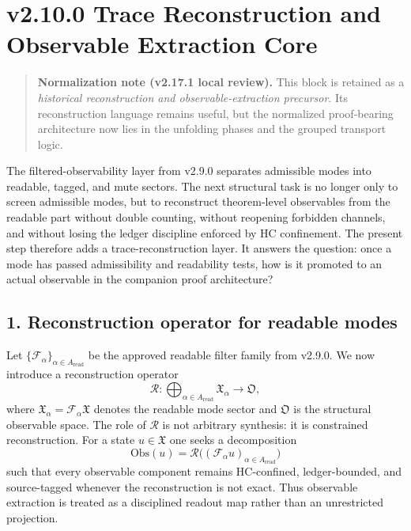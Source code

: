 \section*{v2.10.0 Trace Reconstruction and Observable Extraction Core}

\begin{quote}
\textbf{Normalization note (v2.17.1 local review).}
This block is retained as a \emph{historical reconstruction and observable-extraction precursor}. Its reconstruction language remains useful, but the normalized proof-bearing architecture now lies in the unfolding phases and the grouped transport logic.
\end{quote}

The filtered-observability layer from v2.9.0 separates admissible modes into
readable, tagged, and mute sectors. The next structural task is no longer only to
screen admissible modes, but to reconstruct theorem-level observables from the
readable part without double counting, without reopening forbidden channels, and
without losing the ledger discipline enforced by HC confinement. The present step
therefore adds a trace-reconstruction layer. It answers the question: once a mode
has passed admissibility and readability tests, how is it promoted to an actual
observable in the companion proof architecture?

\subsection*{1. Reconstruction operator for readable modes}
Let $\{\mathcal F_\alpha\}_{\alpha\in A_{\mathrm{read}}}$ be the approved readable
filter family from v2.9.0. We now introduce a reconstruction operator
\[
\mathcal R: \bigoplus_{\alpha\in A_{\mathrm{read}}} \mathfrak X_\alpha \to \mathfrak O,
\]
where $\mathfrak X_\alpha = \mathcal F_\alpha \mathfrak X$ denotes the readable mode
sector and $\mathfrak O$ is the structural observable space. The role of
$\mathcal R$ is not arbitrary synthesis: it is constrained reconstruction. For a
state $u\in\mathfrak X$ one seeks a decomposition
\[
\mathrm{Obs}(u) = \mathcal R\bigl((\mathcal F_\alpha u)_{\alpha\in A_{\mathrm{read}}}\bigr)
\]
such that every observable component remains HC-confined, ledger-bounded, and
source-tagged whenever the reconstruction is not exact. Thus observable extraction
is treated as a disciplined readout map rather than an unrestricted projection.

